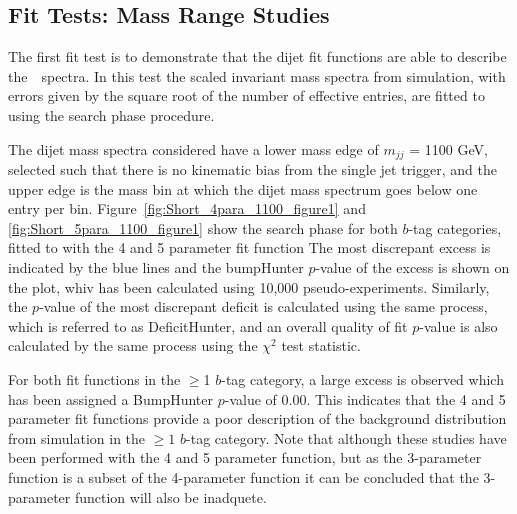 \subsection{Fit Tests: Mass Range Studies}
\label{sec:bkg-summer_range}

The first fit test is to demonstrate that
the dijet fit functions are able to describe the~\mjj~spectra.
In this test the scaled invariant mass spectra from simulation,
with errors given by the square root of the number of effective entries,
are fitted to using the search phase procedure.

The dijet mass spectra considered have a lower mass edge of $m_{jj}$ = 1100 GeV,
selected such that there is no kinematic bias from the single jet trigger,
and the upper edge is the mass bin at which the dijet mass spectrum goes below one entry per bin.
Figure~\ref{fig:Short_4para_1100_figure1} and \ref{fig:Short_5para_1100_figure1} show the search phase
for both $b$-tag categories, fitted to with the 4 and 5 parameter fit function
The most discrepant excess is indicated by the blue lines and the bumpHunter $p$-value of the excess is shown on the plot,
whiv has been calculated using 10,000 pseudo-experiments.
Similarly, the $p$-value of the most discrepant deficit is calculated using the same process, which is referred to as DeficitHunter,
and an overall quality of fit $p$-value is also calculated by the same process using the $\chi^{2}$ test statistic.

For both fit functions in the $\geq$1 $b$-tag category,
a large excess is observed which has been assigned a BumpHunter $p$-value of 0.00.
This indicates that the 4 and 5 parameter fit functions
provide a poor description of the background distribution from simulation
in the $\geq1$ $b$-tag category.
Note that although these studies have been performed with the 4 and 5 parameter function,
but as the 3-parameter function is a subset of the 4-parameter function it can be concluded
that the 3-parameter function will also be inadquete.


